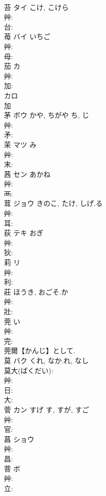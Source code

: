 \documentclass[8pt]{extreport}
\begin{document}
\begin{CJK}{UTF8}{min}
\\	苔	タイ	こけ, こけら		
\\	艸: 
\\	台: 
\\	苺	バイ	いちご		
\\	艸: 
\\	母: 
\\	茄	カ			
\\	艸: 
\\	加: 
\\	カロ
\\	加
\\	茅	ボウ	かや, ちがや	ち, じ	
\\	艸: 
\\	矛: 
\\	茉	マツ		み	
\\	艸: 
\\	末: 
\\	茜	セン	あかね		
\\	艸: 
\\	襾: 
\\	茸	ジョウ	きのこ, たけ, しげ.る		
\\	艸: 
\\	耳: 
\\	荻	テキ	おぎ		
\\	艸: 
\\	狄: 
\\	莉	リ			
\\	艸: 
\\	利: 
\\	莊		ほうき, おごそ.か				
\\	艸: 
\\	壯: 
\\	莞		い				
\\	艸: 
\\	完: 
\\	莞爾【かんじ】として.
\\	莫	バク	くれ, なか.れ, なし		
\\	莫大(ばくだい): 
\\	艸: 
\\	日: 
\\	大: 
\\	菅	カン	すげ	す, すが, すご	
\\	艸: 
\\	官: 
\\	菖	ショウ			
\\	艸: 
\\	昌: 
\\	菩	ボ			
\\	艸: 
\\	立: 

\end{CJK}
\end{document}
